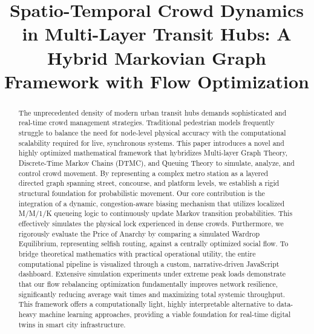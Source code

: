 \documentclass[conference]{IEEEtran}
\begin{document}
\title{Spatio-Temporal Crowd Dynamics in Multi-Layer Transit Hubs: A Hybrid Markovian Graph Framework with Flow Optimization}

\author{
\and
{}
\and
{}
}

\maketitle

\begin{abstract}
The unprecedented density of modern urban transit hubs demands sophisticated and real-time crowd management strategies. Traditional pedestrian models frequently struggle to balance the need for node-level physical accuracy with the computational scalability required for live, synchronous systems. This paper introduces a novel and highly optimized mathematical framework that hybridizes Multi-layer Graph Theory, Discrete-Time Markov Chains (DTMC), and Queuing Theory to simulate, analyze, and control crowd movement. By representing a complex metro station as a layered directed graph spanning street, concourse, and platform levels, we establish a rigid structural foundation for probabilistic movement. Our core contribution is the integration of a dynamic, congestion-aware biasing mechanism that utilizes localized M/M/1/K queueing logic to continuously update Markov transition probabilities. This effectively simulates the physical lock experienced in dense crowds. Furthermore, we rigorously evaluate the Price of Anarchy by comparing a simulated Wardrop Equilibrium, representing selfish routing, against a centrally optimized social flow. To bridge theoretical mathematics with practical operational utility, the entire computational pipeline is visualized through a custom, narrative-driven JavaScript dashboard. Extensive simulation experiments under extreme peak loads demonstrate that our flow rebalancing optimization fundamentally improves network resilience, significantly reducing average wait times and maximizing total systemic throughput. This framework offers a computationally light, highly interpretable alternative to data-heavy machine learning approaches, providing a viable foundation for real-time digital twins in smart city infrastructure.
\end{abstract}
\end{document}
